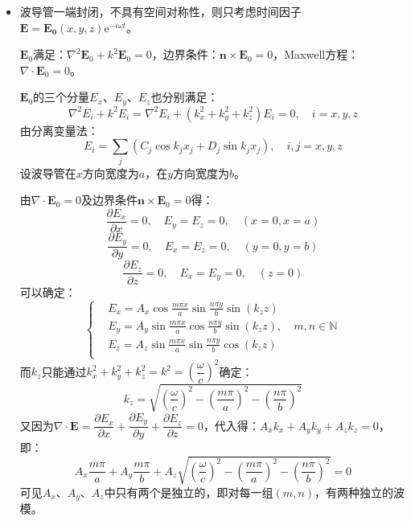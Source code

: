 \documentclass[a4paper,fontset=none]{ctexart}
\begin{document}
\begin{itemize}
    若导电介质为金属：$\dfrac{\sigma}{\omega\varepsilon}\ll1$

    注意到$a_x^2=\dfrac{\omega^2}{c^2}\sin^2\theta_1=\omega^2\mu_0\varepsilon_0\sin^2\theta_1\sim\omega^2\mu\varepsilon$，则$\omega\mu\sigma\gg\omega\mu\varepsilon-\dfrac{\omega^2}{c^2}\sin^2\theta_1$。
    此时有：
    \[
        a_x \ll a_z,\quad a_z \approx b_z \approx \sqrt{\frac{\omega\mu\sigma}{2}}
    \]
    则相速度和透入深度为：
    \[
        v_p = \frac{\omega}{a_z} = \sqrt{\frac{2\omega}{\mu\sigma}},\quad \delta = \frac{1}{b_z} = \sqrt{\frac{2}{\omega\mu\sigma}}
    \]

    \item[9.]
    波导管一端封闭，不具有空间对称性，则只考虑时间因子$\bm{E}=\bm{E_0}(x,y,z)\mathrm{e}^{-i\omega t}$。

    $\bm{E}_0$满足：$\nabla^2\bm{E}_0+k^2\bm{E}_0=0$，边界条件：$\bm{n}\times\bm{E}_0=0$，Maxwell方程：$\nabla\cdot\bm{E}_0=0$。

    $\bm{E}_0$的三个分量$E_x$、$E_y$、$E_z$也分别满足：
    \[
        \nabla^2E_i + k^2E_i = \nabla^2E_i + (k_x^2+k_y^2+k_z^2)E_i = 0,\quad i = x,y,z
    \]
    由分离变量法：
    \[
        E_i = \sum_{j} (C_j\cos k_j x_j + D_j\sin k_j x_j),\quad i,j = x,y,z
    \]
    设波导管在$x$方向宽度为$a$，在$y$方向宽度为$b$。

    由$\nabla\cdot\bm{E}_0=0$及边界条件$\bm{n}\times\bm{E}_0=0$得：
    \[
        \frac{\partial E_x}{\partial x} = 0,\quad E_y = E_z = 0,\quad (x=0,x=a)
    \]
    \[
        \frac{\partial E_y}{\partial y} = 0,\quad E_x = E_z = 0,\quad (y=0,y=b)
    \]
    \[
        \frac{\partial E_z}{\partial z} = 0,\quad E_x = E_y = 0,\quad (z=0)
    \]
    可以确定：
    \[
        \left\{
        \begin{aligned}
            & E_x = A_x\cos\frac{m\pi x}{a}\sin\frac{n\pi y}{b}\sin(k_z z) \\
            & E_y = A_y\sin\frac{m\pi x}{a}\cos\frac{n\pi y}{b}\sin(k_z z),\quad m,n\in\mathbb{N} \\
            & E_z = A_z\sin\frac{m\pi x}{a}\sin\frac{n\pi y}{b}\cos(k_z z) \\
        \end{aligned}
        \right.
    \]
    而$k_z$只能通过$k_x^2+k_y^2+k_z^2=k^2=\left(\dfrac{\omega}{c}\right)^2$确定：
    \[
        k_z=\sqrt{\left(\frac{\omega}{c}\right)^2-\left(\frac{m\pi}{a}\right)^2-\left(\frac{n\pi}{b}\right)^2}
    \]
    又因为$\nabla\cdot\bm{E}=\dfrac{\partial E_x}{\partial x}+\dfrac{\partial E_y}{\partial y}+\dfrac{\partial E_z}{\partial z}=0$，代入得：$A_x k_x+A_y k_y + A_z k_z=0$，即：
    \[
        A_x\frac{m\pi}{a} + A_y\frac{m\pi}{b} + A_z\sqrt{\left(\dfrac{\omega}{c}\right)^2-\left(\dfrac{m\pi}{a}\right)^2-\left(\dfrac{n\pi}{b}\right)^2} = 0
    \]
    可见$A_x$、$A_y$、$A_z$中只有两个是独立的，即对每一组$(m,n)$，有两种独立的波模。


\end{itemize}
\end{document}
